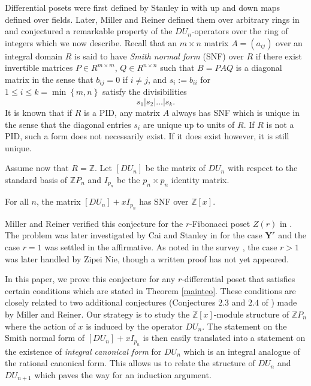 \documentclass[ALCO, Unicode]{cedram}
\newcommand{\ZZ}{\mathbb{Z}}
\begin{document}
Differential posets were first defined by Stanley in \cite{Stanley88} with up and down maps defined over fields. Later, Miller and Reiner defined them over arbitrary rings in \cite{Miller} and conjectured a remarkable property of the $ DU_{n}    $-operators over the ring of integers which we now describe.  Recall that an $ m \times n$ matrix $ A = (a_{ij}) $ over an integral domain $ R $ is said to have \textit{Smith normal form} (SNF) over $ R $ if there exist invertible matrices $ P \in R ^{ m \times m}$, $ Q \in R ^{ n \times n} $ such that $ B = PAQ $ is a diagonal matrix in the sense that $ b_{ij} = 0 $ if $ i \neq j $, and $ s_{i} := b_{ii} $ for $ 1 \leq i \leq k =   \min  \left  \{     m ,  n     \right \} $ satisfy the divisibilities $$ s_{1}| s_{2} | \ldots | s_{k} . $$  It is known that  if     $ R $ is a PID, any matrix $ A $ always has SNF which is unique in the sense that the diagonal entries $ s_{i} $ are unique up to units of $ R $. If $ R $ is not a PID, such a form does not necessarily exist. If it does exist however, it is  still   unique.   

Assume now that $ R =  \ZZ $. Let $ [DU_{n}]$ be the matrix of $ DU_{n} $ with respect to the standard basis of $   \ZZ P_{n} $ and $ I_{p_{n}} $ be the $ p_{n} \times p_{n} $ identity matrix.    
\begin{conjecture}{\cite[Miller-Reiner]{Miller}}  For all $n $, the matrix $  [DU_{n}] + xI_{p_{n}} $ has SNF over $ \ZZ[x] $.      
\label{mainconj}                                                                       
\end{conjecture}
Miller and Reiner verified this conjecture for the $ r $-Fibonacci poset $Z(r)$ in \cite{Miller}. The problem was later investigated by Cai and Stanley in \cite{SNFforYoung} for the case $ \mathbf{Y}^{r} $ and the case $ r = 1 $ was settled in the affirmative. As noted in the survey \cite{SNFsurvey}, the case $ r > 1 $ was later handled by Zipei Nie, though  a written proof has not yet  appeared.                               

In this paper, we prove this conjecture for any $ r$-differential poset that satisfies certain conditions which are stated in Theorem \ref{mainteo}. These conditions %
are  closely related to  two additional conjectures (Conjectures $ 2.3 $ and $ 2.4$ of \cite{Miller}) made by Miller and Reiner.    Our strategy is to study the $ \mathbb{Z}[x] $-module structure of $ \mathbb{Z} P_{n}  $ where the action of $ x $   is induced by the operator $ DU_{n}    $. The statement on the Smith normal form of $ [DU_{n}] + x I_{p_{n}} $ is then easily translated into a statement on the existence of \emph{integral canonical form} for $DU_{n} $ which   is   an integral analogue of the rational canonical form.  This allows us to relate the structure of $ DU_{n} $ and $ DU_{n+1} $    which     paves the way for an induction argument. 
\end{document}
